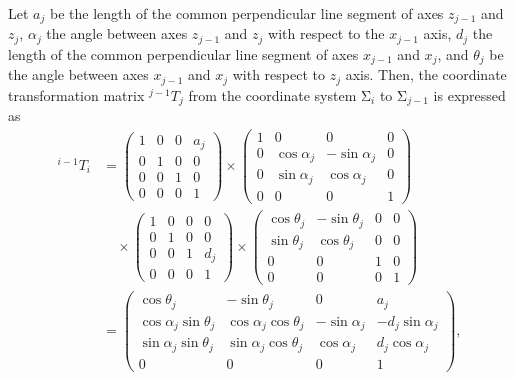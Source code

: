 \documentclass{birkjour}
\theoremstyle{plain}
\theoremstyle{definition}
\newcommand{\rmSigma}{\mathrm{\Sigma}}
\begin{document}
    Let $a_j$ be the length of the common perpendicular line segment
    of axes $z_{j-1}$ and $z_j$,
    $\alpha_j$ the angle between axes $z_{j-1}$ and $z_j$ with respect to the
    $x_{j-1}$ axis, 
    $d_j$ the length of the common perpendicular line segment
    of axes $x_{j-1}$ and $x_j$, 
    and $\theta_j$ be the angle between axes $x_{j-1}$ and $x_j$
    with respect to $z_j$ axis. Then, the coordinate transformation matrix
    ${}^{j-1}T_j$ from the coordinate system $\rmSigma_i$ to $\rmSigma_{j-1}$
    is expressed as
    \begin{align*}
        {}^{i-1} T_i &=
        \begin{pmatrix}
            1 & 0 & 0 & a_j \\
            0 & 1 & 0 & 0 \\
            0 & 0 & 1 & 0 \\
            0 & 0 & 0 & 1
        \end{pmatrix}
        \times
        \begin{pmatrix}
            1 & 0 & 0 & 0 \\
            0 & \cos \alpha_j & - \sin \alpha_j & 0  \\
            0 & \sin \alpha_j & \cos \alpha_j & 0 \\
            0 & 0 & 0 & 1
        \end{pmatrix}
        \\
        &\quad \times
        \begin{pmatrix}
            1 & 0 & 0 & 0 \\
            0 & 1 & 0 & 0 \\
            0 & 0 & 1 & d_j \\
            0 & 0 & 0 & 1
        \end{pmatrix}
        \times
        \begin{pmatrix}
            \cos \theta_j & -\sin \theta_j & 0 & 0 \\
            \sin \theta_j & \cos \theta_j & 0 & 0 \\
            0 & 0 & 1 & 0 \\
            0 & 0 & 0 & 1 
        \end{pmatrix}
        \\
        &= 
        \begin{pmatrix}
            \cos \theta_j & -\sin \theta_j & 0 & a_j \\
            \cos \alpha_j \sin \theta_j & \cos \alpha_j \cos \theta_j & -\sin \alpha_j & -d_j \sin \alpha_j   \\
            \sin \alpha_j \sin \theta_j & \sin \alpha_j \cos \theta_j & \cos \alpha_j & d_j \cos \alpha_j \\
            0 & 0 & 0 & 1
        \end{pmatrix}
        ,
    \end{align*}
\end{document}
